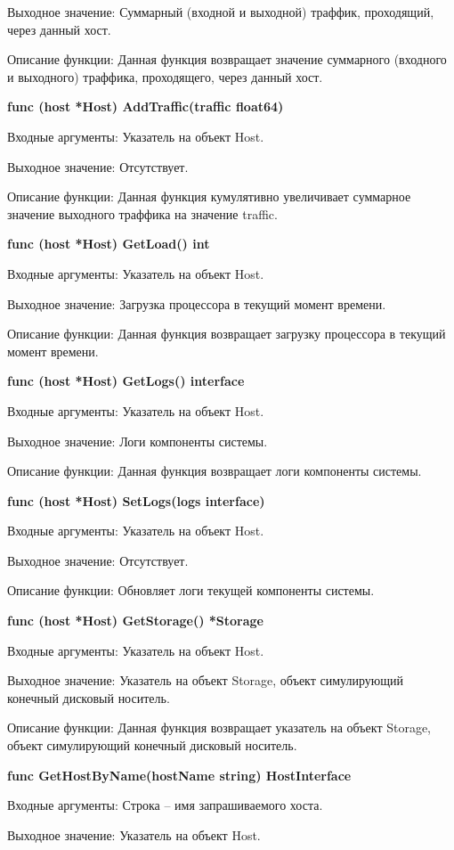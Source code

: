 Выходное значение: Суммарный (входной и выходной) траффик, проходящий, через данный хост. 

Описание функции: Данная функция возвращает значение суммарного (входного и выходного) траффика, проходящего, через данный хост.


\textbf{func (host *Host) AddTraffic(traffic float64)}

Входные аргументы: Указатель на объект Host.

Выходное значение: Отсутствует.

Описание функции: Данная функция кумулятивно увеличивает суммарное значение выходного траффика на значение traffic. 


\textbf{func (host *Host) GetLoad() int }

Входные аргументы: Указатель на объект Host.

Выходное значение: Загрузка процессора в текущий момент времени.

Описание функции: Данная функция возвращает загрузку процессора в текущий момент времени.


\textbf{func (host *Host) GetLogs() interface}

Входные аргументы: Указатель на объект Host.

Выходное значение: Логи компоненты системы. 

Описание функции: Данная функция возвращает логи компоненты системы. 


\textbf{func (host *Host) SetLogs(logs interface)}

Входные аргументы: Указатель на объект Host.

Выходное значение: Отсутствует.

Описание функции: Обновляет логи текущей компоненты системы. 


\textbf{func (host *Host) GetStorage() *Storage }

Входные аргументы: Указатель на объект Host.

Выходное значение: Указатель на объект Storage, объект симулирующий конечный дисковый носитель.

Описание функции: Данная функция возвращает указатель на объект Storage, объект симулирующий конечный дисковый носитель.


\textbf{func GetHostByName(hostName string) HostInterface }

Входные аргументы: Строка -- имя запрашиваемого хоста. 

Выходное значение: Указатель на объект Host.


